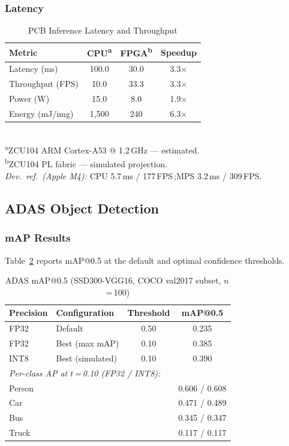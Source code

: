 \documentclass[conference]{IEEEtran}
\begin{document}
\subsubsection{Latency}

\begin{table}[htbp]
\centering
\caption{PCB Inference Latency and Throughput}
\label{tab:performance}
\begin{tabular}{lccc}
\toprule
\textbf{Metric} & \textbf{CPU\textsuperscript{a}} & \textbf{FPGA\textsuperscript{b}} & \textbf{Speedup} \\
\midrule
Latency (ms)     & 100.0 & 30.0 & 3.3$\times$ \\
Throughput (FPS) &  10.0 & 33.3 & 3.3$\times$ \\
Power (W)        &  15.0 &  8.0 & 1.9$\times$ \\
Energy (mJ/img)  & 1{,}500 & 240 & 6.3$\times$ \\
\bottomrule
\end{tabular}
\vspace{0.6ex}\\
{\footnotesize
\textsuperscript{a}ZCU104 ARM Cortex-A53 @ 1.2\,GHz --- estimated.\\
\textsuperscript{b}ZCU104 PL fabric --- simulated projection.\\
\textit{Dev.\ ref.\ (Apple M4):}
CPU 5.7\,ms / 177\,FPS\,;\enspace MPS 3.2\,ms / 309\,FPS.}
\end{table}

\subsection{ADAS Object Detection}

\subsubsection{mAP Results}

Table~\ref{tab:adas_map} reports mAP@0.5 at the default and optimal confidence thresholds.

\begin{table}[htbp]
\centering
\caption{ADAS mAP@0.5 (SSD300-VGG16, COCO val2017 subset, $n$\,=\,100)}
\label{tab:adas_map}
\begin{tabular}{llcc}
\toprule
\textbf{Precision} & \textbf{Configuration} & \textbf{Threshold} & \textbf{mAP@0.5} \\
\midrule
FP32 & Default            & 0.50 & 0.235 \\
FP32 & Best (max mAP)     & 0.10 & 0.385 \\
INT8 & Best (simulated)   & 0.10 & 0.390 \\
\midrule
\multicolumn{4}{l}{\textit{Per-class AP at $t$\,=\,0.10 (FP32 / INT8):}} \\
\quad Person  & & & 0.606 / 0.608 \\
\quad Car     & & & 0.471 / 0.489 \\
\quad Bus     & & & 0.345 / 0.347 \\
\quad Truck   & & & 0.117 / 0.117 \\
\bottomrule
\end{tabular}
\end{table}
\end{document}
